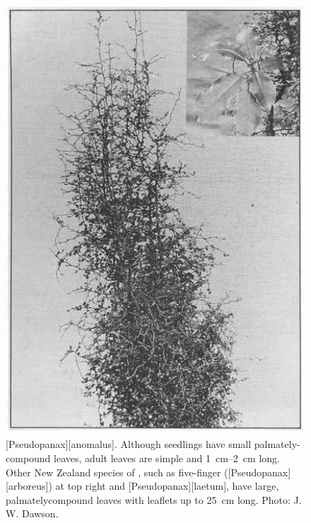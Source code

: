 \begin{figure}[htb]
	\centering
	\begin{minipage}[t]{0.347\textwidth}
		\centering
		\includegraphics[width=\textwidth]{graphics/figure76pseudopanax.jpg}
    	\caption[\emph{Pseudopanax anomalus}]{[Pseudopanax][anomalus].
    	Although seedlings have small palmately-compound leaves, adult leaves are simple and \SIrange{1}{2}{\centi\metre} long.
    	Other New Zealand species of , such as five-finger ([Pseudopanax][arboreus]) at top right and [Pseudopanax][laetum], have large, palmatelycompound leaves with leaflets up to \SI{25}{\centi\metre} long. Photo:  J. W. Dawson.}%
    	\label{fig:76pseudopanax}
	\end{minipage}\hfill%
	\begin{minipage}[t]{0.633\textwidth}

\end{minipage}
\end{figure}
